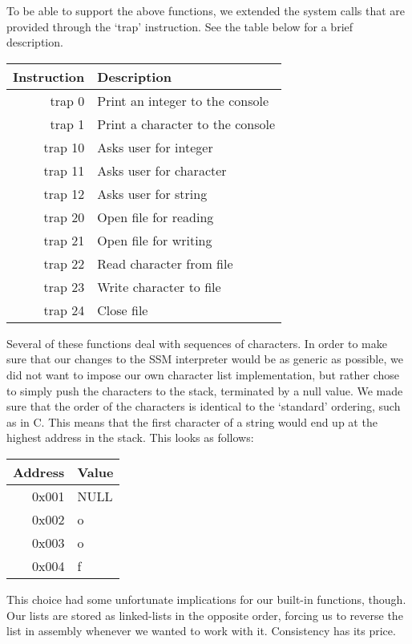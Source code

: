 \documentclass[a4paper]{article}
\begin{document}
To be able to support the above functions, we extended the system calls that are provided through the `trap' instruction. See the table below for a brief description.

\begin{center}
\begin{tabular}{r | l}
Instruction & Description \\
\hline
trap 0 & Print an integer to the console \\
trap 1 & Print a character to the console \\
trap 10 & Asks user for integer \\
trap 11 & Asks user for character \\
trap 12 & Asks user for string  \\
trap 20 & Open file for reading  \\
trap 21 & Open file for writing \\
trap 22 & Read character from file \\
trap 23 & Write character to file \\
trap 24 & Close file
\end{tabular}
\end{center}

Several of these functions deal with sequences of characters. In order to make sure that our changes to the SSM interpreter would be as generic as possible, we did not want to impose our own character list implementation, but rather chose to simply push the characters to the stack, terminated by a null value. We made sure that the order of the characters is identical to the `standard' ordering, such as in C. This means that the first character of a string would end up at the highest address in the stack. This looks as follows:
\begin{center}
\begin{tabular}{|r|l|}
\hline
Address & Value \\
\hline
0x001 & NULL \\
\hline
0x002 & o \\
\hline
0x003 & o \\
\hline
0x004 & f \\
\hline
\end{tabular}
\end{center}

This choice had some unfortunate implications for our built-in functions, though. Our lists are stored as linked-lists in the opposite order, forcing us to reverse the list in assembly whenever we wanted to work with it. Consistency has its price.
\end{document}
